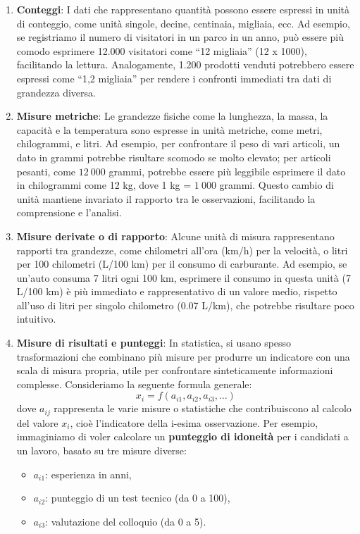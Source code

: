 \documentclass[
  11pt,
]{book}
\providecommand{\tightlist}{%
  \setlength{\itemsep}{0pt}\setlength{\parskip}{0pt}}
\theoremstyle{mytheoremstyle}
\theoremstyle{mydefstyle}
\begin{document}
\begin{enumerate}
\def\labelenumi{\arabic{enumi}.}
\item
  \textbf{Conteggi}: I dati che rappresentano quantità possono essere espressi in unità di conteggio, come unità singole, decine, centinaia, migliaia, ecc. Ad esempio, se registriamo il numero di visitatori in un parco in un anno, può essere più comodo esprimere 12.000 visitatori come ``12 migliaia'' (12 x 1000), facilitando la lettura. Analogamente, 1.200 prodotti venduti potrebbero essere espressi come ``1,2 migliaia'' per rendere i confronti immediati tra dati di grandezza diversa.
\item
  \textbf{Misure metriche}: Le grandezze fisiche come la lunghezza, la massa, la capacità e la temperatura sono espresse in unità metriche, come metri, chilogrammi, e litri. Ad esempio, per confrontare il peso di vari articoli, un dato in grammi potrebbe risultare scomodo se molto elevato; per articoli pesanti, come \(12~000\) grammi, potrebbe essere più leggibile esprimere il dato in chilogrammi come 12 kg, dove 1 kg = \(1~000\) grammi. Questo cambio di unità mantiene invariato il rapporto tra le osservazioni, facilitando la comprensione e l'analisi.
\item
  \textbf{Misure derivate o di rapporto}: Alcune unità di misura rappresentano rapporti tra grandezze, come chilometri all'ora (km/h) per la velocità, o litri per 100 chilometri (L/100 km) per il consumo di carburante. Ad esempio, se un'auto consuma 7 litri ogni 100 km, esprimere il consumo in questa unità (7 L/100 km) è più immediato e rappresentativo di un valore medio, rispetto all'uso di litri per singolo chilometro (0.07 L/km), che potrebbe risultare poco intuitivo.
\item
  \textbf{Misure di risultati e punteggi}: In statistica, si usano spesso trasformazioni che combinano più misure per produrre un indicatore con una scala di misura propria, utile per confrontare sinteticamente informazioni complesse. Consideriamo la seguente formula generale:
  \[
  x_i = f(a_{i1}, a_{i2}, a_{i3}, \dots)
  \]
  dove \(a_{ij}\) rappresenta le varie misure o statistiche che contribuiscono al calcolo del valore \(x_i\), cioè l'indicatore della i-esima osservazione.
  Per esempio, immaginiamo di voler calcolare un \textbf{punteggio di idoneità} per i candidati a un lavoro, basato su tre misure diverse:

  \begin{itemize}
  \tightlist
  \item
    \(a_{i1}\): esperienza in anni,
  \item
    \(a_{i2}\): punteggio di un test tecnico (da 0 a 100),
  \item
    \(a_{i3}\): valutazione del colloquio (da 0 a 5).
  \end{itemize}
\end{enumerate}
\end{document}
